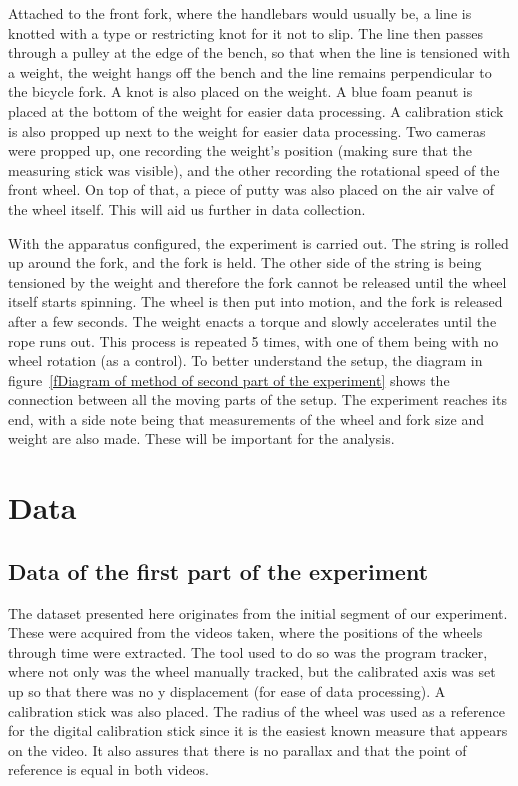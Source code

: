 \documentclass{article}
\begin{document}
Attached to the front fork, where the handlebars would usually be, a line is knotted with a type or restricting knot for it not to slip. The line then passes through a pulley at the edge of the bench, so that when the line is tensioned with a weight, the weight hangs off the bench and the line remains perpendicular to the bicycle fork. A knot is also placed on the weight. A blue foam peanut is placed at the bottom of the weight for easier data processing. A calibration stick is also propped up next to the weight for easier data processing. Two cameras were propped up, one recording the weight's position (making sure that the measuring stick was visible), and the other recording the rotational speed of the front wheel. On top of that, a piece of putty was also placed on the air valve of the wheel itself. This will aid us further in data collection.

With the apparatus configured, the experiment is carried out. The string is rolled up around the fork, and the fork is held. The other side of the string is being tensioned by the weight and therefore the fork cannot be released until the wheel itself starts spinning. The wheel is then put into motion, and the fork is released after a few seconds. The weight enacts a torque and slowly accelerates until the rope runs out. This process is repeated 5 times, with one of them being with no wheel rotation (as a control). To better understand the setup, the diagram in figure~\ref{fDiagram of method of second part of the experiment} shows the connection between all the moving parts of the setup. The experiment reaches its end, with a side note being that measurements of the wheel and fork size and weight are also made. These will be important for the analysis.

\pagebreak
\section{Data}
\subsection{Data of the first part of the experiment}
The dataset presented here originates from the initial segment of our experiment. These were acquired from the videos taken, where the positions of the wheels through time were extracted. The tool used to do so was the program tracker, where not only was the wheel manually tracked, but the calibrated axis was set up so that there was no y displacement (for ease of data processing). A calibration stick was also placed. The radius of the wheel was used as a reference for the digital calibration stick since it is the easiest known measure that appears on the video. It also assures that there is no parallax and that the point of reference is equal in both videos.
\end{document}
